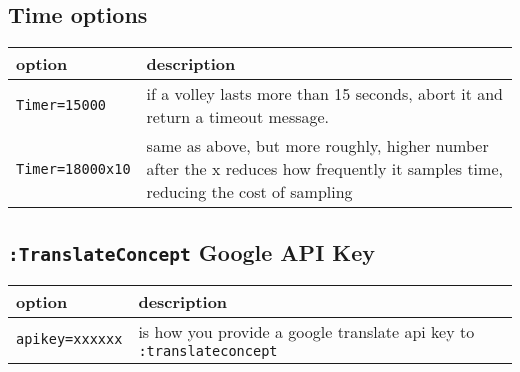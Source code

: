 \documentclass[]{article}
\begin{document}
\subsection{Time options}\label{time-options}

\begin{longtable}[]{@{}ll@{}}
\toprule
\begin{minipage}[b]{0.18\columnwidth}\raggedright\strut
option\strut
\end{minipage} & \begin{minipage}[b]{0.76\columnwidth}\raggedright\strut
description\strut
\end{minipage}\tabularnewline
\midrule
\endhead
\begin{minipage}[t]{0.18\columnwidth}\raggedright\strut
\texttt{Timer=15000}\strut
\end{minipage} & \begin{minipage}[t]{0.76\columnwidth}\raggedright\strut
if a volley lasts more than 15 seconds, abort it and return a timeout
message.\strut
\end{minipage}\tabularnewline
\begin{minipage}[t]{0.18\columnwidth}\raggedright\strut
\texttt{Timer=18000x10}\strut
\end{minipage} & \begin{minipage}[t]{0.76\columnwidth}\raggedright\strut
same as above, but more roughly, higher number after the x reduces how
frequently it samples time, reducing the cost of sampling\strut
\end{minipage}\tabularnewline
\bottomrule
\end{longtable}

\subsection{\texorpdfstring{\texttt{:TranslateConcept} Google API
Key}{:TranslateConcept Google API Key}}\label{translateconcept-google-api-key}

\begin{longtable}[]{@{}ll@{}}
\toprule
\begin{minipage}[b]{0.18\columnwidth}\raggedright\strut
option\strut
\end{minipage} & \begin{minipage}[b]{0.76\columnwidth}\raggedright\strut
description\strut
\end{minipage}\tabularnewline
\midrule
\endhead
\begin{minipage}[t]{0.18\columnwidth}\raggedright\strut
\texttt{apikey=xxxxxx}\strut
\end{minipage} & \begin{minipage}[t]{0.76\columnwidth}\raggedright\strut
is how you provide a google translate api key to
\texttt{:translateconcept}\strut
\end{minipage}\tabularnewline
\bottomrule
\end{longtable}
\end{document}
